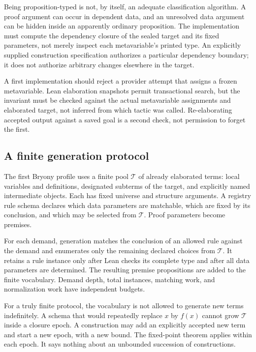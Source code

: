 \documentclass[11pt,a4paper]{article}
\theoremstyle{definition}\newtheorem{definition}[theorem]{Definition}
\theoremstyle{remark}\newtheorem{remark}[theorem]{Remark}
\begin{document}
Being proposition-typed is not, by itself, an adequate classification algorithm. A proof argument can occur in dependent data, and an unresolved data argument can be hidden inside an apparently ordinary proposition. The implementation must compute the dependency closure of the sealed target and its fixed parameters, not merely inspect each metavariable's printed type. An explicitly supplied construction specification authorizes a particular dependency boundary; it does not authorize arbitrary changes elsewhere in the target.

A first implementation should reject a provider attempt that assigns a frozen metavariable. Lean elaboration snapshots permit transactional search, but the invariant must be checked against the actual metavariable assignments and elaborated target, not inferred from which tactic was called. Re-elaborating accepted output against a saved goal is a second check, not permission to forget the first.

\subsection{A finite generation protocol}
The first Bryony profile uses a finite pool $\mathcal T$ of already elaborated terms: local variables and definitions, designated subterms of the target, and explicitly named intermediate objects. Each has fixed universe and structure arguments. A registry rule schema declares which data parameters are matchable, which are fixed by its conclusion, and which may be selected from $\mathcal T$. Proof parameters become premises.

For each demand, generation matches the conclusion of an allowed rule against the demand and enumerates only the remaining declared choices from $\mathcal T$. It retains a rule instance only after Lean checks its complete type and after all data parameters are determined. The resulting premise propositions are added to the finite vocabulary. Demand depth, total instances, matching work, and normalization work have independent budgets.

For a truly finite protocol, the vocabulary is not allowed to generate new terms indefinitely. A schema that would repeatedly replace $x$ by $f(x)$ cannot grow $\mathcal T$ inside a closure epoch. A construction may add an explicitly accepted new term and start a new epoch, with a new bound. The fixed-point theorem applies within each epoch. It says nothing about an unbounded succession of constructions.
\end{document}
